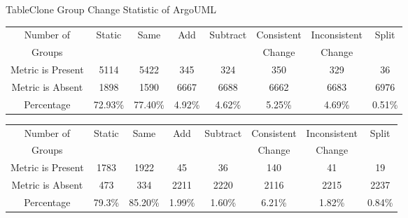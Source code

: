 \begin{table}[htbp]
{Table$\!$}{Clone Group  Change Statistic of ArgoUML}
\vspace{0.5em}
\centering
\footnotesize
\begin{tabular}{cccccccc}
\toprule[1.5pt]
Number of&\multirow{2}{*}{Static}&\multirow{2}{*}{Same}&\multirow{2}{*}{Add}&\multirow{2}{*}{Subtract}&Consistent&Inconsistent&\multirow{2}{*}{Split}\\ 
Groups&&&&&Change&Change&\\ 
\midrule[1pt]
Metric is Present	&5114	&5422	&345	&324	&350	&329	&36\\ 
Metric is Absent	&1898	&1590	&6667	&6688	&6662	&6683	&6976\\ 
Percentage	&72.93\%	&77.40\%	&4.92\%	&4.62\%	&5.25\%	&4.69\%	&0.51\%\\ 
\bottomrule[1.5pt]
\end{tabular}
\end{table}

\begin{table}[htbp]
\vspace{0.5em}
\centering
\footnotesize
\begin{tabular}{cccccccc}
\toprule[1.5pt]
Number of&\multirow{2}{*}{Static}&\multirow{2}{*}{Same}&\multirow{2}{*}{Add}&\multirow{2}{*}{Subtract}&Consistent&Inconsistent&\multirow{2}{*}{Split}\\ 
Groups&&&&&Change&Change&\\ 
\midrule[1pt]
Metric is Present	&1783	&1922	&45	&36	&140	&41	&19\\ 
Metric is Absent	&473	&334	&2211	&2220	&2116	&2215	&2237\\ 
Percentage	&79.3\%	&85.20\%	&1.99\%	&1.60\%	&6.21\%	&1.82\%	&0.84\%\\ 
\bottomrule[1.5pt]
\end{tabular}
\end{table}

